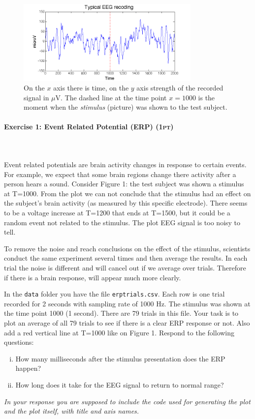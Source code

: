 \documentclass[a4paper,11pt]{article}
\newenvironment{exercise}[3]{\paragraph{Exercise #1: #2 \textsc{(#3pt)}}\ \\}{
\medskip}
\begin{document}
\begin{figure}[H]
   \centering
   \includegraphics[width=0.8\textwidth]{eegrecording.png} 
  \caption{On the $x$ axis there is time, on the $y$ axis strength of the recorded signal in $\mu$V. The dashed line at the time point $x=1000$ is the moment when the \emph{stimulus} (picture) was shown to the test subject.}
\end{figure}


%
%
\begin{exercise}{1}{Event Related Potential (ERP)}{1}\\
Event related potentials are brain activity changes in response to certain events. For
example, we expect that some brain regions change there activity after a person hears a sound. Consider  Figure 1: the test subject was shown a stimulus at T=1000. From the plot we can not conclude that the stimulus had an effect on the subject's brain activity (as measured by this specific electrode). There seems to be a voltage increase at  T=1200 that ends at  T=1500, but it could be a random event not related to the stimulus. The plot EEG signal is too noisy to tell.

To remove the noise and reach conclusions on the effect of the stimulus, scientists conduct the same experiment several times and then average the results. In each trial the noise is different and will cancel out if we average over trials. Therefore if there is a brain response, will appear much more clearly.

In the \texttt{data} folder you have the file \texttt{erptrials.csv}. Each row is one trial recorded for 2 seconds with sampling rate of 1000 Hz. The stimulus was shown at the time point 1000 (1 second). There are 79 trials in this file. Your task is to plot an average of all 79 trials to see if there is
a clear ERP response or not. Also add a red vertical line at T=1000 like on Figure 1. Respond to the following questions: 

\begin{enumerate}[(i)]
\item How many milliseconds after the stimulus presentation does the ERP happen? 
\item How long does it take for the EEG signal to return to normal range?
\end{enumerate}

\emph{In your response you are supposed to include the code used for generating the plot and the plot itself, with title and axis names.} 
\end{exercise}
\end{document}
